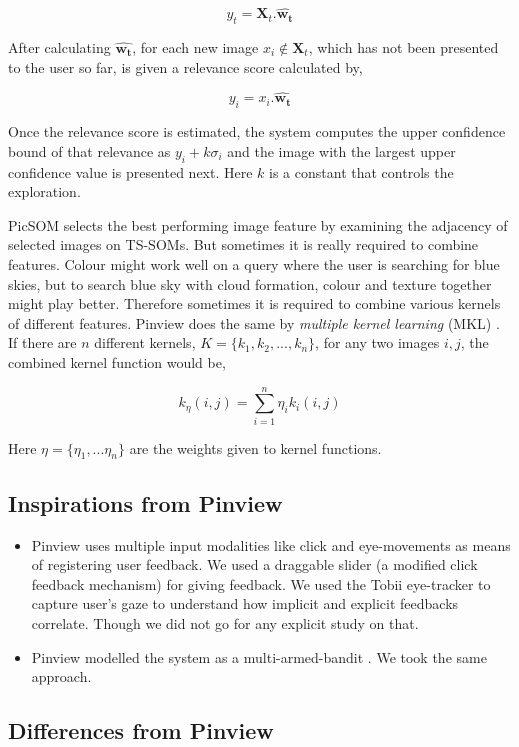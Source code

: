 \documentclass[english]{tktltiki}
\begin{document}
$$
y_t = \mathbf{X}_t . \hat{\mathbf{w_t}}
$$

After calculating $\hat{\mathbf{w_t}}$, for each new image $x_i \notin \mathbf{X}_t$, which has not been presented to the user so far, is given a relevance score calculated by,

$$
y_i = x_i . \hat{\mathbf{w_t}}
$$

Once the relevance score is estimated, the system computes the upper confidence bound of that relevance as $y_i + k \sigma_i$ and the image with the largest upper confidence value is presented next. Here $k$ is a constant that controls the exploration.

PicSOM selects the best performing image feature by examining the adjacency of selected images on TS-SOMs. But sometimes it is really required to combine features. Colour might work well on a query where the user is searching for blue skies, but to search blue sky with cloud formation, colour and texture together might play better. Therefore sometimes it is required to combine various kernels of different features. Pinview does the same by \textit{multiple kernel learning} (MKL) \cite{mkl}. If there are $n$ different kernels, $K = \{k_1, k_2, ..., k_n\}$, for any two images $i, j$, the combined kernel function \cite{Pinview} would be,

$$
k_{\eta}(i, j) = \sum_{i=1}^n \eta_i k_i(i, j)
$$

Here $\eta = \{\eta_1, ...\eta_n\}$ are the weights given to kernel functions.

\subsection{Inspirations from Pinview}

\begin{itemize}
	\item Pinview uses multiple input modalities like click and eye-movements as means of registering user feedback. We used a draggable slider (a modified click feedback mechanism) for giving feedback. We used the Tobii eye-tracker to capture user's gaze to understand how implicit and explicit feedbacks correlate. Though we did not go for any explicit study on that.
	\item Pinview modelled the system as a multi-armed-bandit \cite{bandits}. We took the same approach.
\end{itemize}

\subsection{Differences from Pinview}
\end{document}
